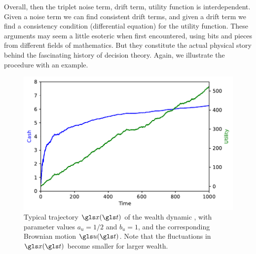 Overall, then the triplet noise term, drift term, utility function is
interdependent. Given a noise term we can find consistent drift terms,
and given a drift term we find a consistency condition (differential
equation) for the utility function. These arguments may seem a little
esoteric when first encountered, using bits and pieces from different 
fields of mathematics. But they constitute the actual physical story behind the
fascinating history of decision theory. Again, we illustrate the procedure with an example.

\begin{figure}
\centering
\includegraphics[width=\textwidth]{./chapter_decisions/figs/trajectories.pdf}
\caption{\small Typical trajectory $\x(\t)$ of the wealth
dynamic , with parameter values $a_u=1/2$ and $b_u=1$,  and the corresponding Brownian motion $\gu(\t)$. Note that the fluctuations in $\x(\t)$ become smaller for larger wealth. }
\end{figure}

